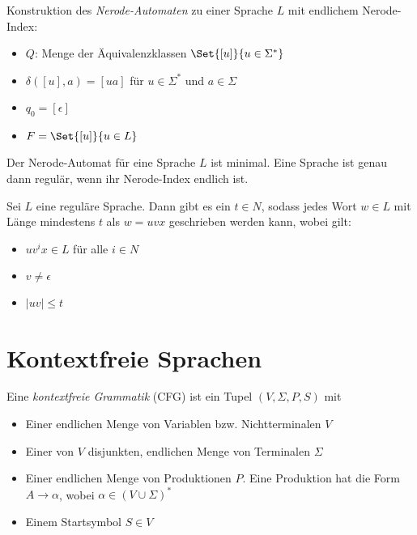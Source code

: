 \documentclass{cheat-sheet}
\begin{document}
\begin{alg}
Konstruktion des \emph{Nerode-Automaten} zu einer Sprache $L$ mit endlichem Nerode-Index:
\end{alg}

\begin{itemize}
  \item $Q$: Menge der Äquivalenzklassen $\Set{[u]}{u \in \Sigma^{*}}$
  \item $\delta([u], a) = [ua]$ für $u \in \Sigma^{*}$ und $a \in \Sigma$
  \item $q_{0} = [ \epsilon ]$
  \item $F = \Set{ [u] }{ u \in L }$
\end{itemize}

\begin{bem}
Der Nerode-Automat für eine Sprache $L$ ist minimal. Eine Sprache ist genau dann regulär, wenn ihr Nerode-Index endlich ist.
\end{bem}

\begin{satz}
Sei $L$ eine reguläre Sprache. Dann gibt es ein $t \in N$, sodass jedes Wort $w \in L$ mit Länge mindestens $t$ als $w = uvx$ geschrieben werden kann, wobei gilt:
\end{satz}

\begin{itemize}
  \item $uv^{i}x \in L$ für alle $i \in N$
  \item $v \neq \epsilon$
  \item $|uv| \le t$
\end{itemize}



\section{Kontextfreie Sprachen}

\begin{defn}
Eine \emph{kontextfreie Grammatik} (CFG) ist ein Tupel $(V, \Sigma, P, S)$ mit

\begin{itemize}
  \item Einer endlichen Menge von Variablen bzw. Nichtterminalen $V$
  \item Einer von $V$ disjunkten, endlichen Menge von Terminalen $\Sigma$
  \item Einer endlichen Menge von Produktionen $P$. Eine Produktion hat die Form $A \longrightarrow \alpha$, wobei $\alpha \in (V \cup \Sigma)^{*}$
  \item Einem Startsymbol $S \in V$
\end{itemize}
\end{defn}
\end{document}
